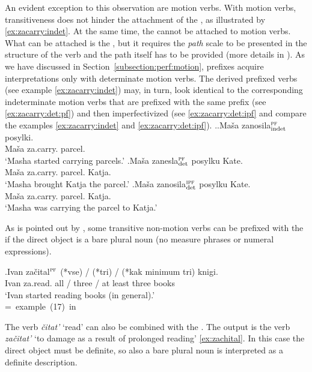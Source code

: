 An evident exception to this observation are motion verbs. With motion verbs, transitiveness does not hinder the attachment of the  , as illustrated by \ref{ex:zacarry:indet}. At the same time, the   cannot be attached to motion verbs. What can be attached is the  , but it requires the \textit{path} scale to be presented in the structure of the verb and the path itself has to be provided (more details in \citealt{ZinovaOsswald:paper}). As we have discussed in Section~\ref{subsection:perf:motion}, prefixes acquire  interpretations only with determinate motion verbs. The derived prefixed verbs (see example \ref{ex:zacarry:indet}) may, in turn, look identical to the corresponding indeterminate motion verbs that are prefixed with the same prefix (see \ref{ex:zacarry:det:pf}) and then imperfectivized (see \ref{ex:zacarry:det:ipf} and compare the examples \ref{ex:zacarry:indet} and \ref{ex:zacarry:det:ipf}).
 \ex.\label{ex:zacarry}\ag.\label{ex:zacarry:indet}Ma\v{s}a zanosila$^{\textsc{pf}}_{\text{\normalfont indet}}$ posylki.\\
 Ma\v{s}a za.carry. parcel.\\
 \trans `Masha started carrying parcels.'
\bg.\label{ex:zacarry:det:pf}Ma\v{s}a zanesla$^{\textsc{pf}}_{\text{\normalfont det}}$ posylku Kate.\\
 Ma\v{s}a za.carry. parcel. Katja.\\
 \trans `Masha brought Katja the parcel.'
\bg.\label{ex:zacarry:det:ipf}Ma\v{s}a zanosila$^{\textsc{ipf}}_{\text{\normalfont det}}$ posylku Kate.\\
 Ma\v{s}a za.carry. parcel. Katja.\\
 \trans `Masha was carrying the parcel to Katja.'
 
As is pointed out by \citet[227]{Braginsky:08}, some transitive non-motion verbs can be prefixed with the   if the direct object is a bare plural noun (no measure phrases or numeral expressions).

\exg.Ivan za\v{c}ital$^{\textsc{pf}}$ (*vse) / (*tri) / (*kak minimum tri) knigi.\\
Ivan za.read. all / three / at least three books\\
\trans `Ivan started reading books (in general).'\\\hbox{}\hfill\hbox{= example (17) in \citealt[227]{Braginsky:08}}

The verb \textit{\v{c}itat'} `read' can also be combined with the  . The output is the verb \textit{za\v{c}itat'} `to damage as a result of prolonged reading' \ref{ex:zachital}. In this case the direct object must be definite, so also a bare plural noun is interpreted as a definite description.

